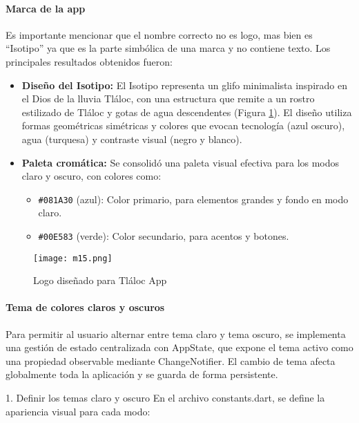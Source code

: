 \paragraph{Marca de la app}
Es importante mencionar que el nombre correcto no es logo, mas bien es ``Isotipo'' ya que es la parte simbólica de una marca y no contiene texto. Los principales resultados obtenidos fueron:

\begin{itemize}
  \item \textbf{Diseño del Isotipo:} El Isotipo representa un glifo minimalista inspirado en el Dios de la lluvia Tláloc, con una estructura que remite a un rostro estilizado de Tláloc y gotas de agua descendentes (Figura \ref{m15}). El diseño utiliza formas geométricas simétricas y colores que evocan tecnología (azul oscuro), agua (turquesa) y contraste visual (negro y blanco).
  
  \item \textbf{Paleta cromática:} Se consolidó una paleta visual efectiva para los modos claro y oscuro, con colores como:
  \begin{itemize}
    \item \texttt{\#081A30} (azul): Color primario, para elementos grandes y fondo en modo claro.
    \item \texttt{\#00E583} (verde): Color secundario, para acentos y botones.
  \end{itemize} 
\end{itemize} 
\begin{figure}[h!]
\centering
  \texttt{[image: m15.png]}
  \caption{Logo diseñado para Tláloc App}
  \label{m15}
\end{figure}






\paragraph{Tema de colores claros y oscuros}


Para permitir al usuario alternar entre tema claro y tema oscuro, se implementa una gestión de estado centralizada con AppState, que expone el tema activo como una propiedad observable mediante ChangeNotifier. El cambio de tema afecta globalmente toda la aplicación y se guarda de forma persistente.

1. Definir los temas claro y oscuro
En el archivo constants.dart, se define la apariencia visual para cada modo:


